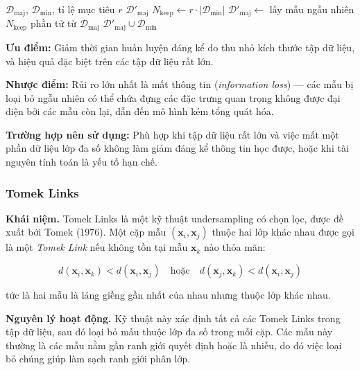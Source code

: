 \begin{algorithm}[H]
\caption{Random Undersampling (RUS)}
\begin{algorithmic}[1]
  \Require $\mathcal{D}_{\text{maj}}$, $\mathcal{D}_{\min}$, tỉ lệ mục tiêu $r$
  \Ensure $\mathcal{D}'_{\text{maj}}$
  \State $N_{\text{keep}} \leftarrow r \cdot |\mathcal{D}_{\min}|$
  \State $\mathcal{D}'_{\text{maj}} \leftarrow$ lấy mẫu ngẫu nhiên $N_{\text{keep}}$ phần tử từ $\mathcal{D}_{\text{maj}}$
  \State \Return $\mathcal{D}'_{\text{maj}} \cup \mathcal{D}_{\min}$
\end{algorithmic}
\end{algorithm}

\textbf{Ưu điểm:} Giảm thời gian huấn luyện đáng kể do thu nhỏ kích thước tập dữ liệu, và hiệu quả đặc biệt trên các tập dữ liệu rất lớn.

\textbf{Nhược điểm:} Rủi ro lớn nhất là mất thông tin (\textit{information loss}) --- các mẫu bị loại bỏ ngẫu nhiên có thể chứa đựng các đặc trưng quan trọng không được đại diện bởi các mẫu còn lại, dẫn đến mô hình kém tổng quát hóa.

\textbf{Trường hợp nên sử dụng:} Phù hợp khi tập dữ liệu rất lớn và việc mất một phần dữ liệu lớp đa số không làm giảm đáng kể thông tin học được, hoặc khi tài nguyên tính toán là yếu tố hạn chế.

\subsubsection{Tomek Links}

\textbf{Khái niệm.}
Tomek Links là một kỹ thuật undersampling có chọn lọc, được đề xuất bởi Tomek (1976). Một cặp mẫu $(\mathbf{x}_i, \mathbf{x}_j)$ thuộc hai lớp khác nhau được gọi là một \textit{Tomek Link} nếu không tồn tại mẫu $\mathbf{x}_k$ nào thỏa mãn:

\begin{equation}
  d(\mathbf{x}_i, \mathbf{x}_k) < d(\mathbf{x}_i, \mathbf{x}_j)
  \quad \text{hoặc} \quad
  d(\mathbf{x}_j, \mathbf{x}_k) < d(\mathbf{x}_i, \mathbf{x}_j)
  \label{eq:tomek}
\end{equation}

\noindent tức là hai mẫu là láng giềng gần nhất của nhau nhưng thuộc lớp khác nhau.

\textbf{Nguyên lý hoạt động.}
Kỹ thuật này xác định tất cả các Tomek Links trong tập dữ liệu, sau đó loại bỏ mẫu thuộc lớp đa số trong mỗi cặp. Các mẫu này thường là các mẫu nằm gần ranh giới quyết định hoặc là nhiễu, do đó việc loại bỏ chúng giúp làm sạch ranh giới phân lớp.

